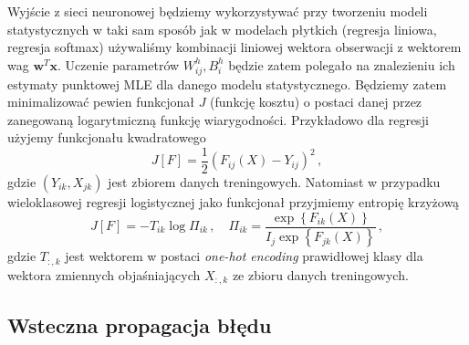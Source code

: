 \documentclass{myclass}
\begin{document}
Wyjście z sieci neuronowej będziemy wykorzystywać przy tworzeniu modeli statystycznych w taki sam
sposób jak w modelach płytkich (regresja liniowa, regresja softmax) używaliśmy kombinacji liniowej
wektora obserwacji z wektorem wag \(\mathbf{w}^T\mathbf{x}\). Uczenie parametrów \(W_{ij}^h, B_i^h\)
będzie zatem polegało na znalezieniu ich estymaty punktowej MLE dla danego modelu statystycznego.
Będziemy zatem minimalizować pewien funkcjonał \(J\) (funkcję kosztu) o postaci danej przez
zanegowaną logarytmiczną funkcję wiarygodności. Przykładowo dla regresji użyjemy funkcjonału
kwadratowego
\begin{equation*}
    J[F] = \frac{1}{2}\left(F_{ij}(X) - Y_{ij}\right)^2\,,
\end{equation*}
gdzie \((Y_{ik}, X_{jk})\) jest zbiorem danych treningowych. Natomiast w przypadku wieloklasowej
regresji logistycznej jako funkcjonał przyjmiemy entropię krzyżową
\begin{equation*}
    J[F] = -T_{ik}\log \Pi_{ik}\,,\quad \Pi_{ik} = \frac{\exp\left\{F_{ik}(X)\right\}}{I_j\exp\left\{F_{jk}(X)\right\}}\,,
\end{equation*}
gdzie \(T_{:,k}\) jest wektorem w postaci \textit{one-hot encoding} prawidłowej klasy dla wektora
zmiennych objaśniających \(X_{:,k}\) ze zbioru danych treningowych.

\subsection{Wsteczna propagacja błędu}
\end{document}
